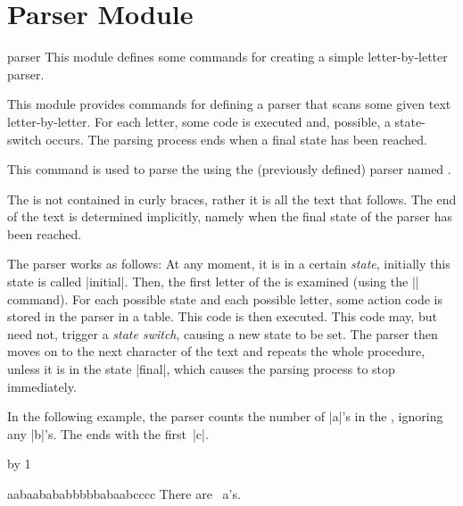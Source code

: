 %
%
%



\section{Parser Module}

\label{section-module-parser}

\begin{pgfmodule}{parser}
  This module defines some commands for creating a simple
  letter-by-letter parser.
\end{pgfmodule}

This module provides commands for defining a parser that scans some
given text letter-by-letter. For each letter, some code is executed
and, possible, a state-switch occurs. The parsing process ends when a
final state has been reached.

\begin{command}{\pgfparserparse{}}
  This command is used to parse the  using the (previously
  defined) parser named .

  The  is not contained in curly braces, rather it is all
  the text that follows. The end of the text is determined implicitly,
  namely when the final state of the parser has been reached.

  The parser works as follows: At any moment, it is in a certain
  \emph{state}, initially this state is called |initial|. Then, the
  first letter of the  is examined (using the |\futurlet|
  command). For each possible state and each possible letter, some
  action code is stored in the parser in a table. This code is then
  executed. This code may, but need not, trigger a \emph{state
    switch}, causing a new state to be set. The parser then moves on
  to the next character of the text and repeats the whole
  procedure, unless it is in the state |final|, which causes the
  parsing process to stop immediately.

  In the following example, the parser counts the number of |a|'s
  in the , ignoring any |b|'s. The  ends with
  the first~|c|.
\begin{codeexample}[]
\newcount\mycount
{}
{\advance\mycount by 1\relax}
{} %
{}%

aabaabababbbbbabaabcccc
There are \the\mycount\ a's.
\end{codeexample}
\end{command}

